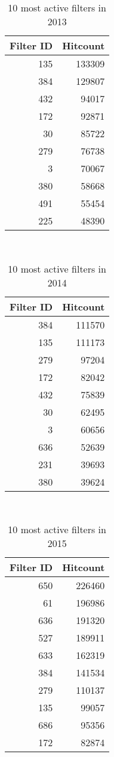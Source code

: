 \begin{table}
  \centering
  \begin{tabular}{r r }
    Filter ID & Hitcount \\
    \hline
    135 & 133309 \\
    384 & 129807 \\
    432 & 94017 \\
    172 & 92871 \\
    30 & 85722 \\
    279 & 76738 \\
    3 & 70067 \\
    380 & 58668 \\
    491 & 55454 \\
    225 & 48390 \\
  \end{tabular}
  \caption{10 most active filters in 2013}~\label{tab:most-active-2013}
\end{table}

\begin{table}
  \centering
  \begin{tabular}{r r }
    Filter ID & Hitcount \\
    \hline
    384 & 111570 \\
    135 & 111173 \\
    279 & 97204 \\
    172 & 82042 \\
    432 & 75839 \\
    30 & 62495 \\
    3 & 60656 \\
    636 & 52639 \\
    231 & 39693 \\
    380 & 39624 \\
  \end{tabular}
  \caption{10 most active filters in 2014}~\label{tab:most-active-2014}
\end{table}

\begin{table}
  \centering
  \begin{tabular}{r r }
    Filter ID & Hitcount \\
    \hline
    650 & 226460 \\
    61 & 196986 \\
    636 & 191320 \\
    527 & 189911 \\
    633 & 162319 \\
    384 & 141534 \\
    279 & 110137 \\
    135 & 99057 \\
    686 & 95356 \\
    172 & 82874 \\
  \end{tabular}
  \caption{10 most active filters in 2015}~\label{tab:most-active-2015}
\end{table}

